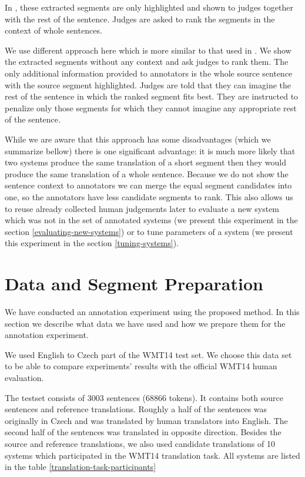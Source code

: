 In , these extracted segments are only highlighted and shown
to judges together with the rest of the sentence. Judges are asked to rank the
segments in the context of whole sentences. 

We use different approach here which is more similar to that used in
. We show the extracted segments without any context
and ask judges to rank them. The only additional information provided to
annotators is the whole source sentence with the source segment highlighted.
Judges are told that they can imagine the rest of the sentence in which the
ranked segment fits best. They are instructed to penalize only those segments
for which they cannot imagine any appropriate rest of the sentence.

While we are aware that this approach has some disadvantages (which we
summarize bellow) there is one significant advantage: it is much more likely
that two systems produce the same translation of a short segment then they
would produce the same translation of a whole sentence. Because we do not show
the sentence context to annotators we can merge the equal segment candidates
into one, so the annotators have less candidate segments to rank. This also
allows us to reuse already collected human judgements later to evaluate a new
system which was not in the set of annotated systems (we present this
experiment in the section \ref{evaluating-new-systems}) or to tune parameters
of a system (we present this experiment in the section \ref{tuning-systems}).

\section{Data and Segment Preparation}

We have conducted an annotation experiment using the proposed method. In this
section we describe what data we have used and how we prepare them for the
annotation experiment.

We used English to Czech part of the WMT14  test
set. We choose this data set to be able to compare experiments' results with
the official WMT14 human evaluation. 

The testset consists of 3003 sentences (68866 tokens). It contains both source
sentences and reference translations. Roughly a half of the sentences was
originally in Czech and was translated by human translators into English. The
second half of the sentences was translated in opposite direction. Besides the
source and reference translations, we also used candidate translations of 10
systems which participated in the WMT14 translation task. All systems are
listed in the table \ref{translation-task-participants}


